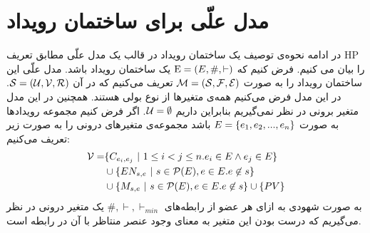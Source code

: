 \section{مدل علّی برای ساختمان رویداد}
\label{es-causal-model}
در ادامه نحوه‌ی توصیف یک ساختمان رویداد در قالب یک مدل علّی مطابق تعریف 
HP
را بیان می کنیم.
فرض کنیم که
$\mathrm{E} = (E,\#,\vdash)$
یک ساختمان رویداد باشد.
مدل علّی این ساختمان رویداد را به صورت
$\mathcal{M} = (\mathcal{S},\mathcal{F},\mathcal{E})$
تعریف می‌کنیم که در آن
$\mathcal{S} = (\mathcal{U},\mathcal{V},\mathcal{R})$.
در این مدل فرض می‌کنیم همه‌ی متغیر‌ها از نوع بولی هستند.
همچنین در این مدل متغیر برونی در نظر نمی‌گیریم بنابراین داریم
$\mathcal{U} = \emptyset$.
اگر فرض کنیم مجموعه‌ رویدادها به صورت
$E = \{e_1,e_2,...,e_n\}$
باشد مجموعه‌ی متغیر‌های درونی را به صورت زیر تعریف می‌کنیم:
\begin{align*}
    \mathcal{V} = & \{C_{e_i,e_j} ~|~  1 \leq i < j \leq n.
    e_i \in E \wedge e_j \in E\}                              \\
                  & \cup \{EN_{s,e} ~|~ s \in \mathcal{P}(E),
    e \in E. e \not \in s \}                                  \\
                  & \cup \{M_{s,e} ~|~ s \in \mathcal{P}(E),
        e \in E. e \not \in s \} \cup \{PV\}
\end{align*}
به صورت شهودی به ازای هر عضو از رابطه‌های
$\#,\vdash,\vdash_{min}$
یک متغیر درونی در نظر می‌گیریم که درست بودن این متغیر به معنای وجود عنصر منتاظر با آن در رابطه است.


